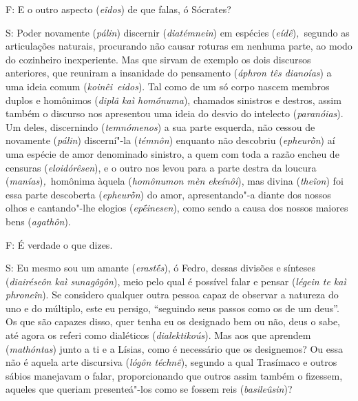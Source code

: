  

F: E o outro aspecto (\emph{eîdos}) de que falas, ó Sócrates?

 

\bekker{[265e]} S: Poder novamente (\emph{pálin}) discernir
(\emph{diatémnein}) em espécies (\emph{eídê})\emph{,}~segundo as
articulações naturais, procurando não causar roturas em nenhuma parte,
ao modo do cozinheiro inexperiente. Mas que sirvam de exemplo os dois
discursos anteriores, que reuniram a insanidade do pensamento
(\emph{áphron tês dianoías}) a uma ideia comum
(\emph{koinêi}~\emph{eidos}). Tal como de um só corpo nascem membros
duplos e homônimos (\emph{diplâ kaì homṓnuma}), chamados sinistros e
destros, \bekker{[266a]} assim também o discurso nos apresentou uma ideia do
desvio do intelecto (\emph{paranóias}). Um deles, discernindo
(\emph{temnómenos}) a sua parte esquerda, não cessou de novamente
(\emph{pálin}) discerní"-la (\emph{témnôn}) enquanto não descobriu
(\emph{epheurṑn}) aí uma espécie de amor denominado sinistro, a quem com
toda a razão encheu de censuras (\emph{eloidórêsen}), e o outro nos
levou para a parte destra da loucura (\emph{manías})\emph{,}~homônima
àquela (\emph{homônumon mèn ekeínôi}), mas divina (\emph{theîon}) foi
essa parte descoberta (\emph{epheurṑn}) do amor, apresentando"-a diante
dos nossos olhos e cantando"-lhe elogios (\emph{epḗinesen}), como sendo a
causa dos nossos maiores bens (\emph{agathôn}).

 

\bekker{[266b]} F: É verdade o que dizes.

 

S: Eu mesmo sou um amante (\emph{erastḗs}), ó Fedro, dessas divisões e
sínteses (\emph{diairéseôn kaì sunagôgôn}), meio pelo qual é possível
falar e pensar (\emph{légein te kaì phroneîn}). Se considero qualquer
outra pessoa capaz de observar a natureza do uno e do múltiplo, este eu
persigo, ``seguindo seus passos como os de um deus''. Os que são capazes
disso, quer tenha eu os designado bem ou não, deus o sabe, até agora os
referi como dialéticos (\emph{dialektikoús}). \bekker{[266c]} Mas aos que
aprendem (\emph{mathóntas}) junto a ti e a Lísias, como é necessário que
os designemos? Ou essa não é aquela arte discursiva (\emph{lógôn
téchnê}), segundo a qual Trasímaco e outros sábios manejavam o falar,
proporcionando que outros assim também o fizessem, aqueles que queriam
presenteá"-los como se fossem reis (\emph{basileûsin})? 

